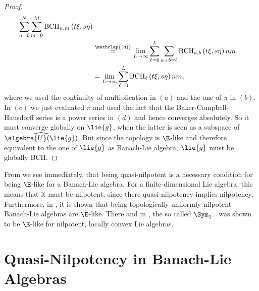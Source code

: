 \documentclass[
11pt,                          %
english                        %
]{article}
\newcommand{\bchpart}[3]{\mathrm{BCH}_{#1}\left(#2, #3\right)}
\newcommand{\bchparts}[4]{\mathrm{BCH}_{#1, #2}\left(#3, #4\right)}
\newcommand\ot[2]{\stackrel{\mathclap{#1}}{#2}}
\begin{document}
\begin{proof}
\begin{align*}
		\sum\limits_{n=0}^{N}
		\sum\limits_{m=0}^{M}
		\bchparts{n}{m}{t \xi}{s \eta}
		\\
		& \ot{(d)}{=}
		\lim_{L \rightarrow \infty}
		\sum\limits_{\ell=0}^{L}
		\sum\limits_{a + b = \ell}
		\bchparts{a}{b}{t \xi}{s \eta}{n}{m}
		\\
		& =
		\lim_{L \rightarrow \infty}
		\sum\limits_{\ell=0}^{L}
		\bchpart{\ell}{t \xi}{s \eta}{n}{m},
	\end{align*}
	where we used the continuity of multiplication in $(a)$ and the one of $\pi$ in 
	$(b)$. In $(c)$ we just evaluated $\pi$ and used the fact that the 
	Baker-Campbell-Hausdorff series is a power series in $(d)$ and hence converges 
	absolutely. So it must converge globally on $\lie{g}$, when the latter is seen 
	as a subspace of $\widehat{\algebra{U}(\lie{g})}$. But since the topology is 
	$\E$-like and therefore equivalent to the one of $\lie{g}$ as Banach-Lie 
	algebra, $\lie{g}$ must be globally BCH.
\end{proof}
From \cite{woj} we see immediately, that being quasi-nilpotent is a necessary 
condition for being $\E$-like for a Banach-Lie algebra. For a finite-dimensional 
Lie algebra, this means that it must be nilpotent, since there quasi-nilpotency 
implies nilpotency. Furthermore, in \cite{stapor:2015a}, it is shown that being 
topologically uniformly nilpotent Banach-Lie algebras are $\E$-like. There and in 
\cite{esposito.stapor.waldmann:2015a:pre}, the so called $\Sym_{1^-}$ was shown to 
be $\E$-like for nilpotent, locally convex Lie algebras.




\section{Quasi-Nilpotency in Banach-Lie Algebras}
\label{sec:QuasiNilpotency}
\end{document}

